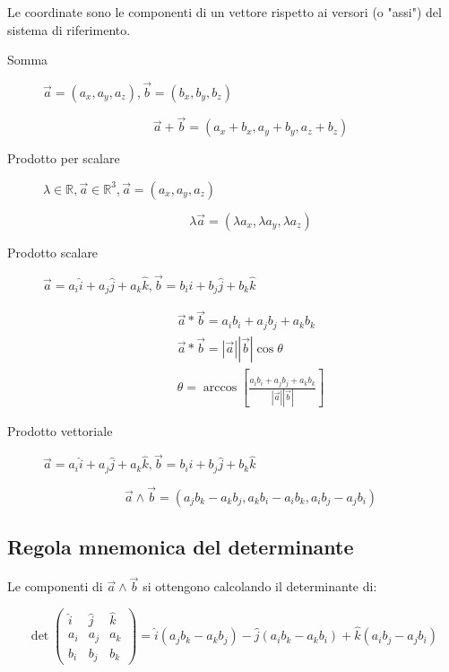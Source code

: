 \documentclass{subfiles}
\begin{document}
Le coordinate sono le componenti di un vettore rispetto ai versori (o "assi") del sistema di riferimento.

\begin{description}
	\item[Somma] $\vec{a} = (a_x, a_y, a_z), \vec{b} = (b_x, b_y, b_z)$

	$$
	\vec{a} + \vec{b} = (a_x+b_x, a_y+b_y, a_z+b_z)
	$$

	\item[Prodotto per scalare] $\lambda \in \mathbb{R}, \vec{a} \in \mathbb{R}^3, \vec{a} = (a_x, a_y, a_z)$

	$$
	\lambda \vec{a} = (\lambda a_x, \lambda a_y, \lambda a_z)
	$$

	\item[Prodotto scalare] $\vec{a} = a_i \hat{i} + a_j \hat{j} + a_k \hat{k}, \vec{b} = b_i \hat{i} + b_j \hat{j} + b_k \hat{k}$

	$$
    \begin{matrix}
    \vec{a} * \vec{b} = a_ib_i + a_jb_j + a_kb_k \\
    \vec{a} * \vec{b} = |\vec{a}| |\vec{b}| \cos{\theta} \\
    \theta = \arccos{[\frac{a_ib_i + a_jb_j + a_kb_k}{|\vec{a}||\vec{b}|}]}
    \end{matrix}
    $$

    \item[Prodotto vettoriale] $\vec{a} = a_i \hat{i} + a_j \hat{j} + a_k \hat{k}, \vec{b} = b_i \hat{i} + b_j \hat{j} + b_k \hat{k}$

    $$
    \vec{a} \wedge \vec{b} = (a_jb_k - a_kb_j, a_kb_i - a_ib_k, a_ib_j - a_jb_i)
    $$
\end{description}

\subsection{Regola mnemonica del determinante}

Le componenti di $\vec{a} \wedge \vec{b}$ si ottengono calcolando il determinante di:

$$
\det{
\begin{pmatrix}
\hat{i} & \hat{j} & \hat{k} \\
a_i & a_j & a_k \\
b_i & b_j & b_k
\end{pmatrix}
} = \hat{i} (a_jb_k - a_kb_j) - \hat{j} (a_ib_k - a_kb_i) + \hat{k} (a_ib_j - a_jb_i)
$$
\end{document}
